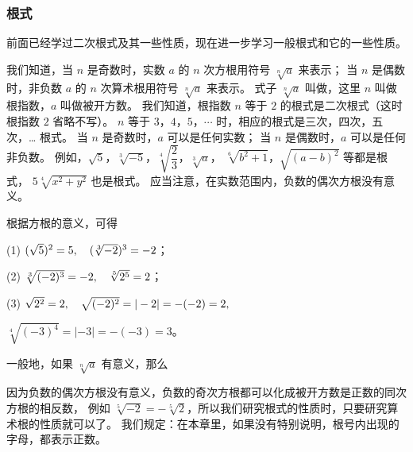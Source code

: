 \subsubsection{根式}

前面已经学过二次根式及其一些性质，现在进一步学习一般根式和它的一些性质。

\begin{enhancedline}
我们知道，当 $n$ 是奇数时，实数 $a$ 的 $n$ 次方根用符号 $\sqrt[n]{a}$ 来表示；
当 $n$ 是偶数时，非负数 $a$ 的 $n$ 次算术根用符号 $\sqrt[n]{a}$ 来表示。
式子 $\sqrt[n]{a}$ 叫做，这里 $n$ 叫做根指数，$a$ 叫做被开方数。
我们知道，根指数 $n$ 等于 $2$ 的根式是二次根式（这时根指数 $2$ 省略不写）。
$n$ 等于 $3$，$4$，$5$，$\cdots$ 时，相应的根式是三次，四次，五次，… \; 根式。
当 $n$ 是奇数时，$a$ 可以是任何实数；
当 $n$ 是偶数时，$a$ 可以是任何非负数。
例如，$\sqrt{5}$，$\sqrt[3]{-5}$，$\sqrt[4]{\dfrac{2}{3}}$，$\sqrt[3]{a}$，
$\sqrt[6]{b^2 + 1}$，$\sqrt{(a - b)^2}$ 等都是根式， $5\sqrt[4]{x^2 + y^2}$ 也是根式。
应当注意，在实数范围内，负数的偶次方根没有意义。
\end{enhancedline}

根据方根的意义，可得

(1) \; $(\sqrt{5})^2 = 5 ,\quad (\sqrt[3]{-2})^3 = -2$；

(2) \; $\sqrt[3]{(-2)^3} = -2 ,\quad \sqrt[5]{2^5} = 2$；

(3) \; $\sqrt{2^2} = 2 ,\quad \sqrt{(-2)^2} = |-2| = -(-2) = 2 ,\quad$

\phantom{(3)} \; $\sqrt[4]{(-3)^4} = |-3| = -(-3) = 3$。

一般地，如果 $\sqrt[n]{a}$ 有意义，那么

\jiange
{}
\jiange


因为负数的偶次方根没有意义，负数的奇次方根都可以化成被开方数是正数的同次方根的相反数，
例如 $\sqrt[5]{-2} = -\sqrt[5]{2}$，所以我们研究根式的性质时，只要研究算术根的性质就可以了。
我们规定：在本章里，如果没有特别说明，根号内出现的字母，都表示正数。

